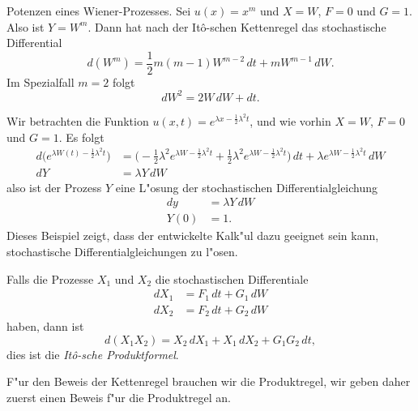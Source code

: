 \begin{beispiel}
Potenzen eines Wiener-Prozesses.
Sei $u(x)=x^m$ und $X=W$, $F=0$ und $G=1$.
Also ist $Y=W^m$.
Dann hat nach der It\^o-schen Kettenregel das stochastische Differential
\[
d(W^m)
=
\frac12m(m-1)W^{m-2}\,dt + mW^{m-1}\,dW.
\]
Im Spezialfall $m=2$ folgt
\[
dW^2 = 2W\,dW + dt.
\]
\end{beispiel}

\begin{beispiel} Wir betrachten die Funktion
$u(x,t)=e^{\lambda x-\frac12\lambda^2 t}$, und wie vorhin $X=W$, $F=0$
und $G=1$.
Es folgt
\begin{align*}
d\biggl(
e^{\lambda W(t)-\frac12\lambda^2 t}
\biggr)
&=
\biggl(
-\frac12\lambda^2 e^{\lambda W-\frac12\lambda^2 t}
+
\frac12\lambda^2 e^{\lambda W-\frac12\lambda^2 t}
\biggr)\,dt
+
\lambda e^{\lambda W -\frac12\lambda^2 t}\,dW
\\
dY&=\lambda Y\,dW
\end{align*}
also ist der Prozess $Y$ eine L"osung der stochastischen Differentialgleichung
\begin{align*}
dy&=\lambda Y\,dW
\\
Y(0)&=1.
\end{align*}
Dieses Beispiel zeigt, dass der entwickelte Kalk"ul dazu geeignet sein kann,
stochastische Differentialgleichungen zu l"osen.
\end{beispiel}

\begin{satz}
Falls die Prozesse $X_1$ und $X_2$ die stochastischen Differentiale
\begin{align*}
dX_1
&=
F_1\,dt + G_1\,dW
\\
dX_2
&=
F_2\,dt + G_2\,dW
\end{align*}
haben, dann ist
\begin{equation}
d(X_1X_2)
=
X_2\,dX_1 + X_1\,dX_2 + G_1G_2\,dt,
\label{stochastisch:ito-produkt}
\end{equation}
dies ist die {\em It\^o-sche Produktformel}.
\end{satz}

F"ur den Beweis der Kettenregel brauchen wir die Produktregel, wir geben
daher zuerst einen Beweis f"ur die Produktregel an.

